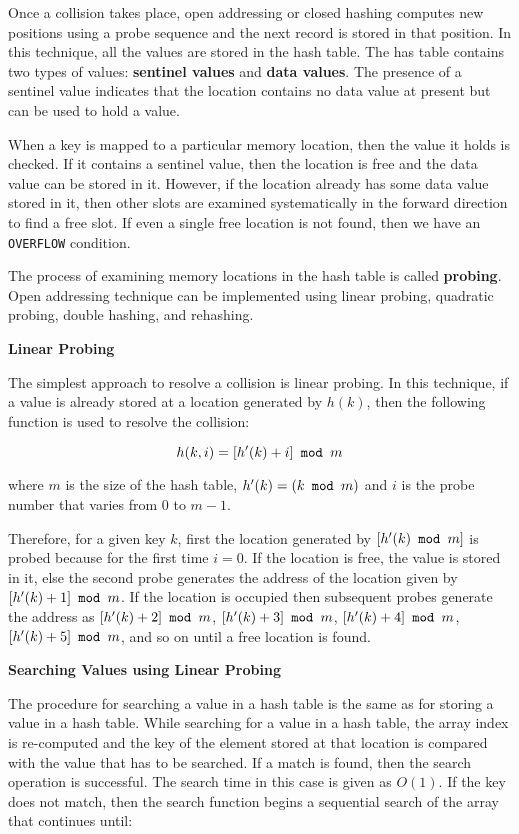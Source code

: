 \vskip 1mm
Once a collision takes place, open addressing or closed hashing computes new positions using a probe sequence and the next record is stored in that position. In this technique, all the values are stored in the hash table. The has table contains two types of values: {\bf sentinel values} and {\bf data values}. The presence of a sentinel value indicates that the location contains no data value at present but can be used to hold a value.

\vskip 1mm
When a key is mapped to a particular memory location, then the value it holds is checked. If it contains a sentinel value, then the location is free and the data value can be stored in it. However, if the location already has some data value stored in it, then other slots are examined systematically in the forward direction to find a free slot. If even a single free location is not found, then we have an {\tt OVERFLOW} condition.

\vskip 1mm
The process of examining memory locations in the hash table is called {\bf probing}. Open addressing technique can be implemented using linear probing, quadratic probing, double hashing, and rehashing.

\filbreak
\vskip 3mm
{\bf Linear Probing}

\vskip 1mm
The simplest approach to resolve a collision is linear probing. In this technique, if a value is already stored at a location generated by $h(k)$, then the following function is used to resolve the collision:

$$h(k,i)=[h'(k)+i]\hbox{\tt{} mod }m$$

where $m$ is the size of the hash table, $h'(k)=(k\hbox{\tt{} mod }m)$ and $i$ is the probe number that varies from $0$ to $m-1$.

\vskip 1mm
Therefore, for a given key $k$, first the location generated by $[h'(k)\hbox{\tt{} mod }m]$ is probed because for the first time $i=0$. If the location is free, the value is stored in it, else the second probe generates the address of the location given by $[h'(k)+1]\hbox{\tt{} mod }m$. If the location is occupied then subsequent probes generate the address as $[h'(k)+2]\hbox{\tt{} mod } m$, $[h'(k)+3]\hbox{\tt{} mod } m$, $[h'(k)+4]\hbox{\tt{} mod } m$,$[h'(k)+5]\hbox{\tt{} mod } m$, and so on until a free location is found.

\vskip 3mm
{\bf Searching Values using Linear Probing}

\vskip 1mm
The procedure for searching a value in a hash table is the same as for storing a value in a hash table. While searching for a value in a hash table, the array index is re-computed and the key of the element stored at that location is compared with the value that has to be searched. If a match is found, then the search operation is successful. The search time in this case is given as $O(1)$. If the key does not match, then the search function begins a sequential search of the array that continues until:

